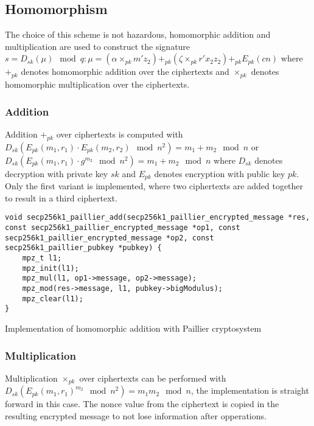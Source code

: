 \subsection{Homomorphism}

The choice of this scheme is not hazardous, homomorphic addition and
multiplication are used to construct the signature $s = D_{sk}(\mu)
\mod q : \mu = (\alpha \times_{pk} m'z_2) +_{pk} (\zeta \times_{pk} r'x_2z_2)
+_{pk} E_{pk}(cn)$ where $+_{pk}$ denotes homomorphic addition over the
ciphertexts and $\times_{pk}$ denotes homomorphic multiplication over the
ciphertexts.

\subsubsection{Addition}
Addition $+_{pk}$ over ciphertexts is computed with $D_{sk}(E_{pk}(m_1, r_1)
\cdot E_{pk}(m_2, r_2) \mod n^2) = m_1 + m_2 \mod n$ or $D_{sk}(E_{pk}(m_1, r_1)
\cdot g^{m_2} \mod n^2) = m_1 + m_2 \mod n$ where $D_{sk}$ denotes decryption
with private key $sk$ and $E_{pk}$ denotes encryption with public key $pk$. Only
the first variant is implemented, where two ciphertexts are added together to
result in a third ciphertext.

\begin{listing}
  \begin{verbatim}
void secp256k1_paillier_add(secp256k1_paillier_encrypted_message *res, const secp256k1_paillier_encrypted_message *op1, const secp256k1_paillier_encrypted_message *op2, const secp256k1_paillier_pubkey *pubkey) {
    mpz_t l1;
    mpz_init(l1);
    mpz_mul(l1, op1->message, op2->message);
    mpz_mod(res->message, l1, pubkey->bigModulus);
    mpz_clear(l1);
}
  \end{verbatim}
	\caption{Implementation of homomorphic addition with Paillier cryptosystem}
	\label{lst:implHomomorphAddPaillier}
\end{listing}

\subsubsection{Multiplication}

Multiplication $\times_{pk}$ over ciphertexts can be performed with
$D_{sk}(E_{pk}(m_1, r_1)^{m_2} \mod n^2) = m_1 m_2 \mod n$, the implementation
is straight forward in this case. The nonce value from the ciphertext is copied
in the resulting encrypted message to not lose information after opperations.

